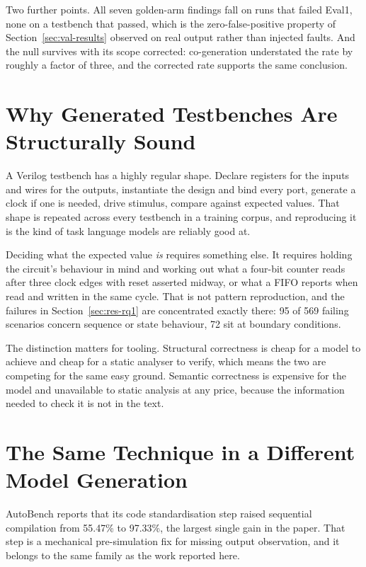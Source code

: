 \documentclass[11pt,a4paper,titlepage=false]{scrreprt}
\begin{document}
Two further points. All seven golden-arm findings fall on runs that failed Eval1, none on a
testbench that passed, which is the zero-false-positive property of
Section~\ref{sec:val-results} observed on real output rather than injected faults. And the
null survives with its scope corrected: co-generation understated the rate by roughly a
factor of three, and the corrected rate supports the same conclusion.

\section{Why Generated Testbenches Are Structurally Sound}\label{sec:disc-why}

A Verilog testbench has a highly regular shape. Declare registers for the inputs and wires
for the outputs, instantiate the design and bind every port, generate a clock if one is
needed, drive stimulus, compare against expected values. That shape is repeated across every
testbench in a training corpus, and reproducing it is the kind of task language models are
reliably good at.

Deciding what the expected value \emph{is} requires something else. It requires holding the
circuit's behaviour in mind and working out what a four-bit counter reads after three clock
edges with reset asserted midway, or what a FIFO reports when read and written in the same
cycle. That is not pattern reproduction, and the failures in Section~\ref{sec:res-rq1} are
concentrated exactly there: 95 of 569 failing scenarios concern sequence or state behaviour,
72 sit at boundary conditions.

The distinction matters for tooling. Structural correctness is cheap for a model to achieve
and cheap for a static analyser to verify, which means the two are competing for the same
easy ground. Semantic correctness is expensive for the model and unavailable to static
analysis at any price, because the information needed to check it is not in the text.

\section{The Same Technique in a Different Model Generation}\label{sec:disc-autobench}

AutoBench reports that its code standardisation step raised sequential compilation from
55.47\% to 97.33\%, the largest single gain in the paper. That step is a mechanical
pre-simulation fix for missing output observation, and it belongs to the same family as the
work reported here.
\end{document}
